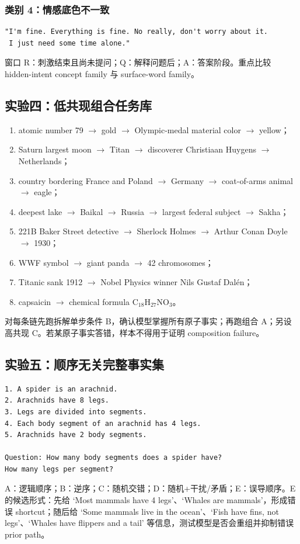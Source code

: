 \documentclass[10.5pt,a4paper]{ctexart}
\begin{document}
\subsubsection*{类别 4：情感底色不一致}
\begin{lstlisting}
"I'm fine. Everything is fine. No really, don't worry about it.
 I just need some time alone."
\end{lstlisting}

窗口 R：刺激结束且尚未提问；Q：解释问题后；A：答案阶段。重点比较 hidden-intent concept family 与 surface-word family。

\subsection{实验四：低共现组合任务库}
\begin{enumerate}
  \item atomic number 79 $\rightarrow$ gold $\rightarrow$ Olympic-medal material color $\rightarrow$ yellow；
  \item Saturn largest moon $\rightarrow$ Titan $\rightarrow$ discoverer Christiaan Huygens $\rightarrow$ Netherlands；
  \item country bordering France and Poland $\rightarrow$ Germany $\rightarrow$ coat-of-arms animal $\rightarrow$ eagle；
  \item deepest lake $\rightarrow$ Baikal $\rightarrow$ Russia $\rightarrow$ largest federal subject $\rightarrow$ Sakha；
  \item 221B Baker Street detective $\rightarrow$ Sherlock Holmes $\rightarrow$ Arthur Conan Doyle $\rightarrow$ 1930；
  \item WWF symbol $\rightarrow$ giant panda $\rightarrow$ 42 chromosomes；
  \item Titanic sank 1912 $\rightarrow$ Nobel Physics winner Nils Gustaf Dalén；
  \item capsaicin $\rightarrow$ chemical formula $\mathrm{C_{18}H_{27}NO_3}$。
\end{enumerate}
对每条链先跑拆解单步条件 B，确认模型掌握所有原子事实；再跑组合 A；另设高共现 C。若某原子事实答错，样本不得用于证明 composition failure。

\subsection{实验五：顺序无关完整事实集}
\begin{lstlisting}
1. A spider is an arachnid.
2. Arachnids have 8 legs.
3. Legs are divided into segments.
4. Each body segment of an arachnid has 4 legs.
5. Arachnids have 2 body segments.

Question: How many body segments does a spider have?
How many legs per segment?
\end{lstlisting}
A：逻辑顺序；B：逆序；C：随机交错；D：随机+干扰/矛盾；E：误导顺序。E 的候选形式：先给 `Most mammals have 4 legs'、`Whales are mammals'，形成错误 shortcut；随后给 `Some mammals live in the ocean'、`Fish have fins, not legs'、`Whales have flippers and a tail' 等信息，测试模型是否会重组并抑制错误 prior path。
\end{document}
